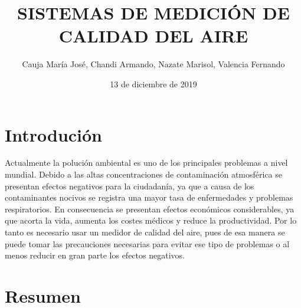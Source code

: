 \documentclass[10pt,a4paper]{article}
\begin{document}
\author{Cauja María José, Chandi Armando, Nazate Marisol, Valencia Fernando} %
\title{\textbf{SISTEMAS DE MEDICIÓN DE CALIDAD DEL AIRE}}
\date{13 de diciembre de 2019}
\maketitle  

\section{Introdución}


Actualmente la polución ambiental es uno de los principales problemas a nivel mundial. Debido a las altas concentraciones de contaminación atmosférica se presentan efectos negativos para la ciudadanía, ya que a causa de los contaminantes nocivos se registra una mayor tasa de enfermedades y problemas respiratorios. En consecuencia se presentan efectos económicos considerables, ya que acorta la vida, aumenta los costes médicos y reduce la productividad. Por lo tanto es necesario usar un medidor de calidad del aire, pues de esa manera se puede tomar las precauciones necesarias para evitar ese tipo de problemas o al menos reducir en gran parte los efectos negativos.

\section{Resumen}
\end{document}
